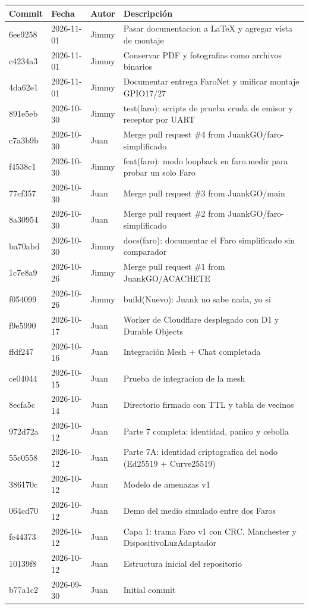 {\footnotesize
\begin{longtable}{P{1.3cm} P{1.8cm} P{1.2cm} P{9.3cm}}
\toprule
Commit & Fecha & Autor & Descripción\\
\midrule\endhead
6ee9258 & 2026-11-01 & Jimmy & Pasar documentacion a LaTeX y agregar vista de montaje\\
c4234a3 & 2026-11-01 & Jimmy & Conservar PDF y fotografias como archivos binarios\\
4da62e1 & 2026-11-01 & Jimmy & Documentar entrega FaroNet y unificar montaje GPIO17/27\\
891e5eb & 2026-10-30 & Jimmy & test(faro): scripts de prueba cruda de emisor y receptor por UART\\
c7a3b9b & 2026-10-30 & Juan & Merge pull request \#4 from JuankGO/faro-simplificado\\
f4538c1 & 2026-10-30 & Jimmy & feat(faro): modo loopback en faro.medir para probar un solo Faro\\
77cf357 & 2026-10-30 & Juan & Merge pull request \#3 from JuankGO/main\\
8a30954 & 2026-10-30 & Juan & Merge pull request \#2 from JuankGO/faro-simplificado\\
ba70abd & 2026-10-30 & Jimmy & docs(faro): documentar el Faro simplificado sin comparador\\
1c7e8a9 & 2026-10-26 & Jimmy & Merge pull request \#1 from JuankGO/ACACHETE\\
f054099 & 2026-10-26 & Jimmy & build(Nuevo): Juank no sabe nada, yo si\\
f9e5990 & 2026-10-17 & Juan & Worker de Cloudflare desplegado con D1 y Durable Objects\\
ffdf247 & 2026-10-16 & Juan & Integración Mesh + Chat completada\\
ce04044 & 2026-10-15 & Juan & Prueba de integracion de la mesh\\
8ecfa5c & 2026-10-14 & Juan & Directorio firmado con TTL y tabla de vecinos\\
972d72a & 2026-10-12 & Juan & Parte 7 completa: identidad, panico y cebolla\\
55c0558 & 2026-10-12 & Juan & Parte 7A: identidad criptografica del nodo (Ed25519 + Curve25519)\\
386170c & 2026-10-12 & Juan & Modelo de amenazas v1\\
064cd70 & 2026-10-12 & Juan & Demo del medio simulado entre dos Faros\\
fe44373 & 2026-10-12 & Juan & Capa 1: trama Faro v1 con CRC, Manchester y DispositivoLuzAdaptador\\
10139f8 & 2026-10-12 & Juan & Estructura inicial del repositorio\\
b77a1c2 & 2026-09-30 & Juan & Initial commit\\
\bottomrule
\end{longtable}}
